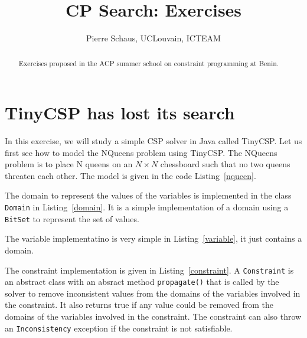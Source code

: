 \documentclass{article}
\title{CP Search: Exercises}
\author{Pierre Schaus, UCLouvain, ICTEAM}
\begin{document}
    \maketitle

    \begin{abstract}
     Exercises proposed in the ACP summer school on constraint programming at Benin.
    \end{abstract}

    \section{TinyCSP has lost its search}

    In this exercise, we will study a simple CSP solver in Java called TinyCSP.
    Let us first see how to model the NQueens problem using TinyCSP.
    The NQueens problem is to place N queens on an $N \times N$ chessboard such that no two queens threaten each other.
    The model is given in the code Listing~\ref{nqueen}.

    \begin{minipage}{\linewidth}
        
    \end{minipage}

    The domain to represent the values of the variables is implemented in the class \texttt{Domain}
    in Listing~\ref{domain}.
    It is a simple implementation of a domain using a \texttt{BitSet} to represent the set of values.


    \begin{minipage}{\linewidth}
        
    \end{minipage}



    The variable implementatino is very simple in Listing~\ref{variable}, it just contains a domain.

    \begin{minipage}{\linewidth}
        
    \end{minipage}


    The constraint implementation is given in Listing~\ref{constraint}.
    A \texttt{Constraint} is an abstract class with an absract method \texttt{propagate()}
    that is called by the solver to remove inconsistent values from the domains of the variables involved in the constraint.
    It also returns true if any value could be removed from the domains of the variables involved in the constraint.
    The constraint can also throw an \texttt{Inconsistency} exception if the constraint is not satisfiable.
\end{document}
